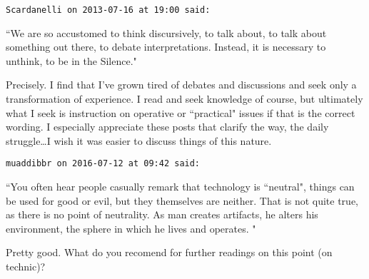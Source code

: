 \begin{footnotesize}\begin{sffamily}



\texttt{Scardanelli on 2013-07-16 at 19:00 said: }

``We are so accustomed to think discursively, to talk about, to talk about something out there, to debate interpretations. Instead, it is necessary to unthink, to be in the Silence."

Precisely. I find that I've grown tired of debates and discussions and seek only a transformation of experience. I read and seek knowledge of course, but ultimately what I seek is instruction on operative or ``practical" issues if that is the correct wording. I especially appreciate these posts that clarify the way, the daily struggle…I wish it was easier to discuss things of this nature.


\hfill

\texttt{muaddibbr on 2016-07-12 at 09:42 said: }

``You often hear people casually remark that technology is ``neutral", things can be used for good or evil, but they themselves are neither. That is not quite true, as there is no point of neutrality. As man creates artifacts, he alters his environment, the sphere in which he lives and operates. "

Pretty good. What do you recomend for further readings on this point (on technic)?


\end{sffamily}\end{footnotesize}

